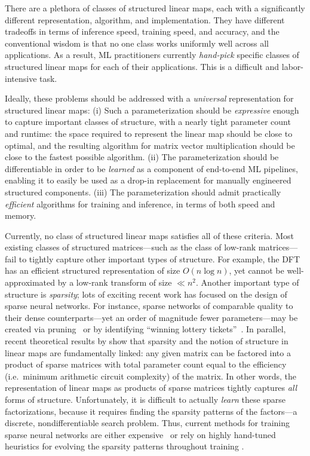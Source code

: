 There are a plethora of classes of structured linear maps, each with a significantly different representation, algorithm, and implementation. They have different tradeoffs in terms of inference speed, training speed, and accuracy, and the conventional wisdom is that no one class works uniformly well across all applications. As a result, ML practitioners currently \textit{hand-pick} specific classes of structured linear maps for each of their applications. This is a difficult and labor-intensive task.

Ideally, these problems should be addressed with a \textit{universal}
representation for structured linear maps: (i) Such a parameterization should be \textit{expressive} enough to capture important classes of structure, with a nearly tight parameter count and runtime: the space required to represent the linear map should be close to optimal, and the resulting algorithm for matrix vector multiplication should be close to the fastest possible algorithm. (ii) The parameterization should be differentiable in order to be
\textit{learned} as a component of end-to-end ML pipelines, enabling it to easily be used as a drop-in replacement for manually engineered structured components. (iii) The parameterization should admit practically \textit{efficient} algorithms for training and inference, in terms of both speed and memory.

Currently, no class of structured linear maps satisfies all of these criteria. Most existing classes of structured matrices---such as the class of low-rank matrices---fail to tightly capture other important types of structure. For example, the DFT has an efficient structured representation of size $O(n \log n)$, yet cannot be well-approximated by a low-rank transform of size $\ll n^2$. Another important type of structure is \textit{sparsity}; lots of exciting recent work has focused on the design of sparse neural networks. For instance, sparse networks of comparable quality to their dense counterparts---yet an order of magnitude fewer parameters---may be created via pruning~\citep{han2016deep} or by identifying ``winning lottery tickets''~\citep{frankle2019lottery}. In parallel, recent theoretical results by \cite{desa2018two} show that sparsity and the notion of structure in linear maps are fundamentally linked: any given matrix can be factored into a product of sparse matrices with total parameter count equal to the efficiency (i.e.\ minimum arithmetic circuit complexity) of the matrix. In other words, the representation of linear maps as products of sparse matrices tightly captures \textit{all} forms of structure. Unfortunately, it is difficult to actually \textit{learn} these sparse factorizations, because it requires finding the sparsity patterns of the factors---a discrete, nondifferentiable search problem. Thus, current methods for training sparse neural networks are either expensive~\citep{frankle2019lottery} or rely on highly hand-tuned heuristics for evolving the sparsity patterns throughout training \citep{dettmers2019sparse}.

